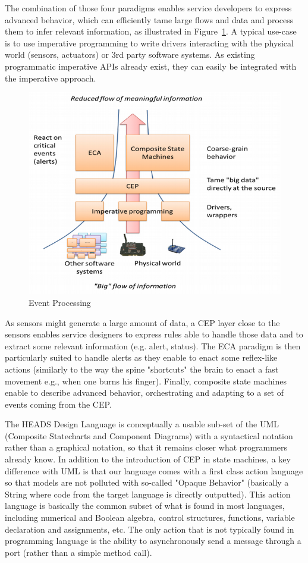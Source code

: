 The combination of those four paradigms enables service developers to express advanced behavior, which can efficiently tame large flows and data and process them to infer relevant information, as illustrated in Figure~\ref{fig:fig1}. A typical use-case is to use imperative programming to write drivers interacting with the physical world (sensors, actuators) or 3rd party software systems. As existing programmatic imperative APIs already exist, they can easily be integrated with the imperative approach. 

\begin{figure}[h]
\centering
\includegraphics[width=0.7\linewidth]{figures/fig1}
\caption[Event Processing]{Event Processing}
\label{fig:fig1}
\end{figure}


As sensors might generate a large amount of data, a CEP layer close to the sensors enables service designers to express rules able to handle those data and to extract some relevant information (e.g. alert, status). The ECA paradigm is then particularly suited to handle alerts as they enable to enact some reflex-like actions (similarly to the way the spine "shortcuts" the brain to enact a fast movement e.g., when one burns his finger). Finally, composite state machines enable to describe advanced behavior, orchestrating and adapting to a set of events coming from the CEP. 

The HEADS Design Language is conceptually a usable sub-set of the UML (Composite Statecharts and Component Diagrams) with a syntactical notation rather than a graphical notation, so that it remains closer what programmers already know. In addition to the introduction of CEP in state machines, a key difference with UML is that our language comes with a first class action language so that models are not polluted with so-called "Opaque Behavior" (basically a String where code from the target language is directly outputted). This action language is basically the common subset of what is found in most languages, including numerical and Boolean algebra, control structures, functions, variable declaration and assignments, etc. The only action that is not typically found in programming language is the ability to asynchronously send a message through a port (rather than a simple method call). 

